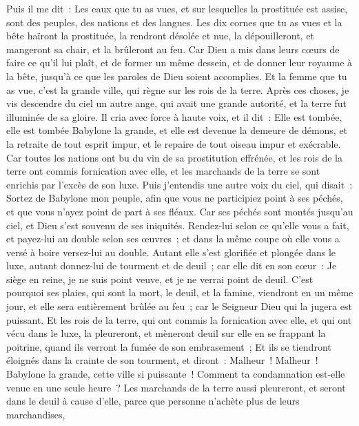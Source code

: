 \begin{multicols}{2}
Puis il me dit~: Les eaux que tu as vues, et sur lesquelles la prostituée est assise, sont des peuples, des nations et des langues.
Les dix cornes que tu as vues et la bête haïront la prostituée, la rendront désolée et nue, la dépouilleront, et mangeront sa chair, et la brûleront au feu.
Car Dieu a mis dans leurs cœurs de faire ce qu'il lui plaît, et de former un même dessein, et de donner leur royaume à la bête, jusqu'à ce que les paroles de Dieu soient accomplies.
Et la femme que tu as vue, c'est la grande ville, qui règne sur les rois de la terre.
\VerseOne{}Après ces choses, je vis descendre du ciel un autre ange, qui avait une grande autorité, et la terre fut illuminée de sa gloire.
Il cria avec force à haute voix, et il dit~: Elle est tombée, elle est tombée Babylone la grande, et elle est devenue la demeure de démons, et la retraite de tout esprit impur, et le repaire de tout oiseau impur et exécrable.
Car toutes les nations ont bu du vin de sa prostitution effrénée, et les rois de la terre ont commis fornication avec elle, et les marchands de la terre se sont enrichis par l'excès de son luxe.
Puis j'entendis une autre voix du ciel, qui disait~: Sortez de Babylone mon peuple, afin que vous ne participiez point à ses péchés, et que vous n'ayez point de part à ses fléaux.
Car ses péchés sont montés jusqu'au ciel, et Dieu s'est souvenu de ses iniquités.
Rendez-lui selon ce qu'elle vous a fait, et payez-lui au double selon ses œuvres~; et dans la même coupe où elle vous a versé à boire versez-lui au double.
Autant elle s'est glorifiée et plongée dans le luxe, autant donnez-lui de tourment et de deuil~; car elle dit en son cœur~: Je siège en reine, je ne suis point veuve, et je ne verrai point de deuil.
C'est pourquoi ses plaies, qui sont la mort, le deuil, et la famine, viendront en un même jour, et elle sera entièrement brûlée au feu~; car le Seigneur Dieu qui la jugera est puissant.
Et les rois de la terre, qui ont commis la fornication avec elle, et qui ont vécu dans le luxe, la pleureront, et mèneront deuil sur elle en se frappant la poitrine, quand ils verront la fumée de son embrasement~;
Et ils se tiendront éloignés dans la crainte de son tourment, et diront~: Malheur~! Malheur~! Babylone la grande, cette ville si puissante~! Comment ta condamnation est-elle venue en une seule heure~?
Les marchands de la terre aussi pleureront, et seront dans le deuil à cause d'elle, parce que personne n'achète plus de leurs marchandises,

\end{multicols}
